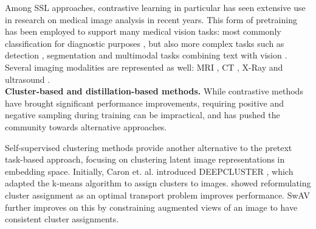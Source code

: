 \documentclass[times,twocolumn,final]{elsarticle}
\begin{document}
{\color{newtext} Among SSL approaches, contrastive learning in particular has seen extensive use in research on medical image analysis in recent years. This form of pretraining has been employed to support many medical vision tasks: most commonly classification for diagnostic purposes \citep{chen2021uscl, ke2021histopathology, yang2021focal, xing2021categorical, dong2021fed, zhao2021radiomics, huang2021retinopathy, dufumier2021proxy}, but also more complex tasks such as detection \citep{li2021domain, tian2021anomaly, lei2021localization}, segmentation \citep{wu2021fedseg, hu2021semi, zeng2021volumetric, boutillon2021pediatric, zhou2021acseg} and multimodal tasks combining text with vision \citep{liu2021vqa, jiao2020vsus}. Several imaging modalities are represented as well: MRI \citep{wu2021fedseg, hu2021semi, dufumier2021proxy, boutillon2021pediatric}, CT \citep{yang2021focal, lei2021localization, zhou2021acseg}, X-Ray \citep{li2021domain, liu2021vqa} and ultrasound \citep{chen2021uscl, jiao2020vsus}. }
\\
\noindent\textbf{Cluster-based and distillation-based methods.} 
While contrastive methods have brought significant performance improvements, requiring positive and negative sampling during training can be impractical, and has pushed the community towards alternative approaches.

Self-supervised clustering methods \citep{caron2018deep, asano2019self, caron2020unsupervised, grill2020bootstrap, caron2021emerging} provide another alternative to the pretext task-based approach, focusing on clustering latent image representations in embedding space.
Initially, Caron et. al. introduced DEEPCLUSTER \citep{caron2018deep}, which adapted the k-means algorithm to assign clusters to images.
\cite{asano2019self} showed reformulating cluster assignment as an optimal transport problem improves performance.
SwAV \citep{caron2020unsupervised} further improves on this by constraining augmented views of an image to have consistent cluster assignments.
\end{document}
